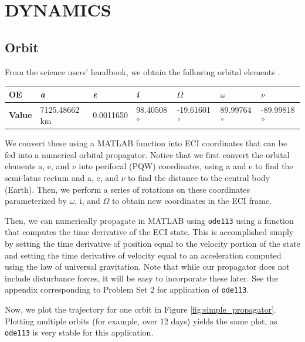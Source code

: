 \section{\Large DYNAMICS}
\subsection{Orbit}

From the science users' handbook, we obtain the following orbital elements \cite{NISARHandbook}.

\begin{table}[H]
\begin{tabular}{lllllll}
\textbf{OE} & \textit{a} & \textit{e} & \textit{i} & \textit{$\Omega$} & \textit{$\omega$} & \textit{$\nu$} \\ \hline
\textbf{Value} & 7125.48662 km & 0.0011650 & 98.40508$\degree$ & -19.61601$\degree$ & 89.99764$\degree$ & -89.99818$\degree$
\end{tabular}
\end{table}

We convert these using a MATLAB function into ECI coordinates that can be fed into a numerical orbital propagator. Notice that we first convert the orbital elements a, e, and $\nu$ into perifocal (PQW) coordinates, using a and e to find the semi-latus rectum and a, e, and $\nu$ to find the distance to the central body (Earth). Then, we perform a series of rotations on these coordinates parameterized by $\omega$, i, and $\Omega$ to obtain new coordinates in the ECI frame.

Then, we can numerically propagate in MATLAB using \texttt{ode113} using a function that computes the time derivative of the ECI state. This is accomplished simply by setting the time derivative of position equal to the velocity portion of the state and setting the time derivative of velocity equal to an acceleration computed using the law of universal gravitation. Note that while our propagator does not include disturbance forces, it will be easy to incorporate these later. See the appendix corresponding to Problem Set 2 for application of \texttt{ode113}.

Now, we plot the trajectory for one orbit in Figure \ref{fig:simple_propagator}. Plotting multiple orbits (for example, over 12 days) yields the same plot, as \texttt{ode113} is very stable for this application.

